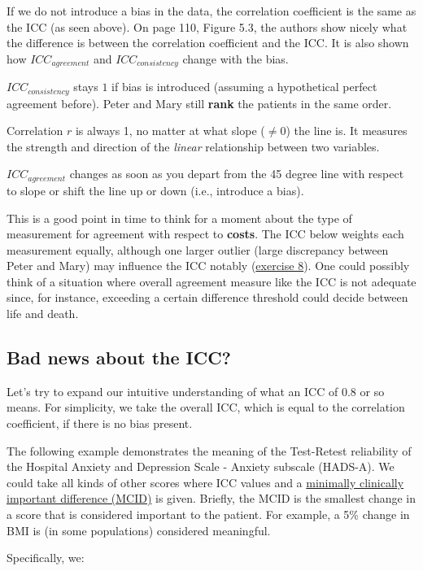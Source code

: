 \documentclass[
]{book}
\begin{document}
If we do not introduce a bias in the data, the correlation coefficient
is the same as the ICC (as seen above). On page 110, Figure 5.3, the authors show nicely
what the difference is between the correlation coefficient and the ICC.
It is also shown how \(ICC_{agreement}\) and \(ICC_{consistency}\) change with the bias.

\(ICC_{consistency}\) stays \(1\) if bias is introduced (assuming a hypothetical
perfect agreement before). Peter and Mary still \textbf{rank} the patients
in the same order.

Correlation \(r\) is always 1, no matter at what slope (\(\ne 0\)) the line is.
It measures the strength and direction of the \emph{linear} relationship between two variables.

\(ICC_{agreement}\) changes as soon as you depart from the 45 degree line
with respect to slope or
shift the line up or down (i.e., introduce a bias).

This is a good point in time to think for a moment about the type of measurement
for agreement with respect to \textbf{costs}. The ICC below weights each measurement
equally, although one larger outlier (large discrepancy between Peter and Mary)
may influence the ICC notably (\hyperref[exercise8]{exercise 8}).
One could possibly think of a situation where
overall agreement measure like the ICC is not adequate since,
for instance, exceeding a certain
difference threshold could decide between life and death.

\subsection{Bad news about the ICC?}\label{badnews}

Let's try to expand our intuitive understanding of what an ICC of 0.8 or so means.
For simplicity, we take the overall ICC, which is equal to the correlation coefficient,
if there is no bias present.

The following example demonstrates the meaning of the Test-Retest reliability of
the Hospital Anxiety and Depression Scale - Anxiety subscale (HADS-A). We could take
all kinds of other scores where ICC values and a
\href{https://en.wikipedia.org/wiki/Minimal_important_difference}{minimally clinically important difference (MCID)}
is given. Briefly, the MCID is the smallest change in a score that is considered
important to the patient. For example, a 5\% change in BMI is (in some populations)
considered meaningful.

Specifically, we:
\end{document}

